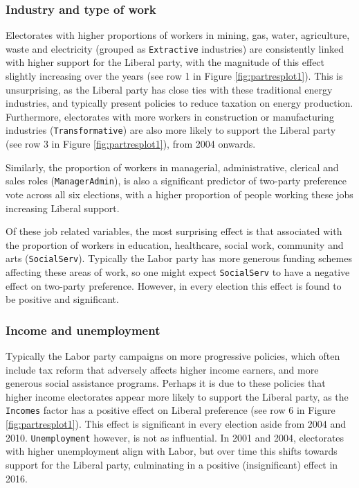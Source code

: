 \documentclass[times, doublespace]{anzsauth}
\begin{document}
\hypertarget{industry-and-type-of-work}{%
\subsubsection*{Industry and type of work}\label{industry-and-type-of-work}}

Electorates with higher proportions of workers in mining, gas, water, agriculture, waste and electricity (grouped as \texttt{Extractive} industries) are consistently linked with higher support for the Liberal party, with the magnitude of this effect slightly increasing over the years (see row 1 in Figure \ref{fig:partresplot1}). This is unsurprising, as the Liberal party has close ties with these traditional energy industries, and typically present policies to reduce taxation on energy production. Furthermore, electorates with more workers in construction or manufacturing industries (\texttt{Transformative}) are also more likely to support the Liberal party (see row 3 in Figure \ref{fig:partresplot1}), from 2004 onwards.

Similarly, the proportion of workers in managerial, administrative, clerical and sales roles (\texttt{ManagerAdmin}), is also a significant predictor of two-party preference vote across all six elections, with a higher proportion of people working these jobs increasing Liberal support.

Of these job related variables, the most surprising effect is that associated with the proportion of workers in education, healthcare, social work, community and arts (\texttt{SocialServ}). Typically the Labor party has more generous funding schemes affecting these areas of work, so one might expect \texttt{SocialServ} to have a negative effect on two-party preference. However, in every election this effect is found to be positive and significant.

\hypertarget{income-and-unemployment}{%
\subsubsection*{Income and unemployment}\label{income-and-unemployment}}

Typically the Labor party campaigns on more progressive policies, which often include tax reform that adversely affects higher income earners, and more generous social assistance programs. Perhaps it is due to these policies that higher income electorates appear more likely to support the Liberal party, as the \texttt{Incomes} factor has a positive effect on Liberal preference (see row 6 in Figure \ref{fig:partresplot1}). This effect is significant in every election aside from 2004 and 2010. \texttt{Unemployment} however, is not as influential. In 2001 and 2004, electorates with higher unemployment align with Labor, but over time this shifts towards support for the Liberal party, culminating in a positive (insignificant) effect in 2016.
\end{document}
